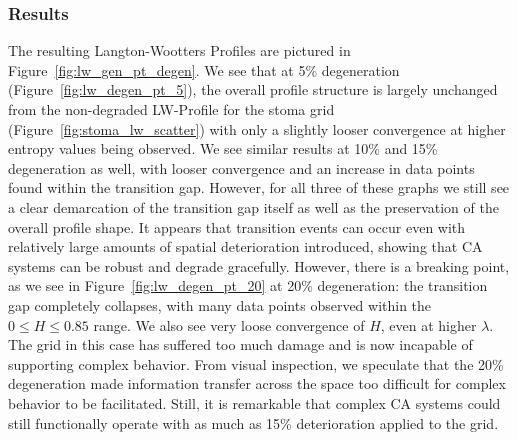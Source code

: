 \documentclass[a4paper,11pt,twoside]{report}
\begin{document}
\subsubsection*{Results}

The resulting Langton-Wootters Profiles are pictured in Figure~\ref{fig:lw_gen_pt_degen}. We see that at 5\% degeneration (Figure~\ref{fig:lw_degen_pt_5}), the overall profile structure is largely unchanged from the non-degraded LW-Profile for the stoma grid (Figure~\ref{fig:stoma_lw_scatter}) with only a slightly looser convergence at higher entropy values being observed. We see similar results at 10\% and 15\% degeneration as well, with looser convergence and an increase in data points found within the transition gap. However, for all three of these graphs we still see a clear demarcation of the transition gap itself as well as the preservation of the overall profile shape. It appears that transition events can occur even with relatively large amounts of spatial deterioration introduced, showing that CA systems can be robust and degrade gracefully. However, there is a breaking point, as we see in Figure~\ref{fig:lw_degen_pt_20} at 20\% degeneration: the transition gap completely collapses, with many data points observed within the $0 \le H \le 0.85$ range. We also see very loose convergence of $H$, even at higher $\lambda$. The grid in this case has suffered too much damage and is now incapable of supporting complex behavior. From visual inspection, we speculate that the 20\% degeneration made information transfer across the space too difficult for complex behavior to be facilitated. Still, it is remarkable that complex CA systems could still functionally operate with as much as 15\% deterioration applied to the grid.
\end{document}
